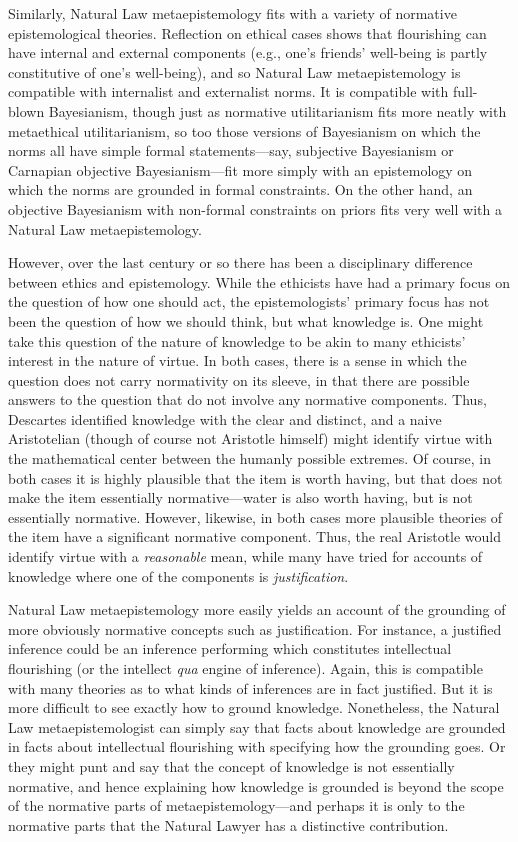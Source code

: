 Similarly, Natural Law metaepistemology fits with a variety of normative epistemological theories. Reflection on ethical cases
shows that flourishing can have internal and external components (e.g., one's friends' well-being is partly constitutive of one's 
well-being), and so Natural Law metaepistemology is compatible with internalist and externalist norms. It is compatible with 
full-blown Bayesianism, though just as normative utilitarianism fits more neatly with metaethical utilitarianism, so too those
versions of Bayesianism on which the norms all have simple formal statements---say, subjective Bayesianism or Carnapian objective
Bayesianism---fit more simply with an epistemology on which the norms are grounded in formal constraints. On the other hand, an
objective Bayesianism with non-formal constraints on priors fits very well with a Natural Law metaepistemology.

However, over the last century or so there has been a disciplinary difference between ethics and epistemology. While the ethicists
have had a primary focus on the question of how one should act, the epistemologists' primary focus has not been the question of 
how we should think, but what knowledge is. One might take this question of the nature of knowledge to be akin to many ethicists' 
interest in the nature of virtue. In both cases, there is a sense in which the question does not carry normativity on its sleeve,
in that there are possible answers to the question that do not involve any normative components. Thus, Descartes identified knowledge
with the clear and distinct, and a naive Aristotelian (though of course not Aristotle himself) might identify virtue with the 
mathematical center between the humanly possible extremes. Of course, in both cases it is highly plausible that the item is worth
having, but that does not make the item essentially normative---water is also worth having, but is not essentially normative.
However, likewise, in both cases more plausible theories of the item have a significant normative component. Thus, the real 
Aristotle would identify virtue with a \textit{reasonable} mean, while many have tried for accounts of knowledge where one of the
components is \textit{justification}. 

Natural Law metaepistemology more easily yields an account of the grounding of more obviously normative concepts such as 
justification. For instance, a justified inference could be an inference performing which constitutes intellectual flourishing 
(or the intellect \textit{qua} engine of inference). Again, this is compatible with many theories as to what kinds of inferences
are in fact justified. But it is more difficult to see exactly how to ground knowledge. Nonetheless, the Natural Law metaepistemologist
can simply say that facts about knowledge are grounded in facts about intellectual flourishing with specifying how the grounding
goes.  Or they might punt and say that the concept of knowledge is not essentially normative, and hence explaining how knowledge is
grounded is beyond the scope of the normative parts of metaepistemology---and perhaps it is only to the normative parts that the
Natural Lawyer has a distinctive contribution.

